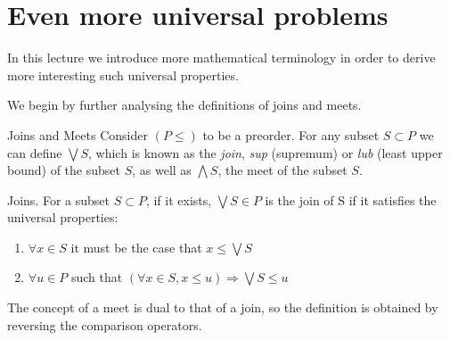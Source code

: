 \chapter{Even more universal problems}

In this lecture we introduce more mathematical terminology in order to 
derive more interesting such universal properties.

We begin by further analysing the definitions of joins and meets.

\begin{section}{Joins and Meets}
Consider $(P \leq)$ to be a preorder. For any subset $S \subset P$ we can define 
$\bigvee S$, which is known as the \emph{join}, \emph{sup} (supremum) or \emph{lub} 
(least upper bound) of the subset $S$, as well as $\bigwedge S$, the meet of the subset $S$.
\begin{definition}\label{defjoins}{Joins.} 
    For a subset $S \subset P$, if it exists, $\bigvee S \in P$ is the join of S if
    it satisfies the universal properties:
        \begin{enumerate}
            \item $\forall x \in S$ it must be the case that $x \leq \bigvee S$ 
            \item $\forall u \in P$ such that $(\forall x \in S, x \leq u) \Rightarrow \bigvee S \leq u$
        \end{enumerate}
\end{definition}

The concept of a meet is dual to that of a join, so the definition is obtained
by reversing the comparison operators.


\end{section}
